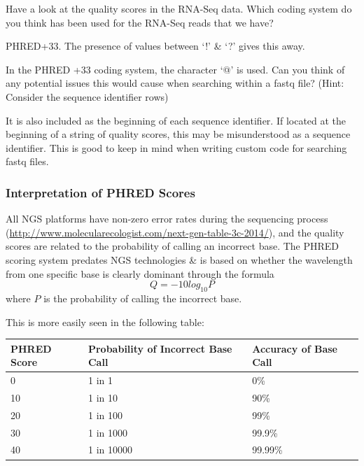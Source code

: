 \begin{questions}
Have a look at the quality scores in the RNA-Seq data. 
Which coding system do you think has been used for the RNA-Seq reads that we have? \\
\begin{answer}
PHRED+33. 
The presence of values between `!' \& `?' gives this away.\\
\end{answer}
In the PHRED +33 coding system, the character `@' is used.
Can you think of any potential issues this would cause when searching within a fastq file? 
(Hint: Consider the sequence identifier rows)\\
\begin{answer}
It is also included as the beginning of each sequence identifier.
If located at the beginning of a string of quality scores, this may be misunderstood as a sequence identifier.
This is good to keep in mind when writing custom code for searching fastq files.
\end{answer}
\end{questions}

\subsubsection{Interpretation of PHRED Scores}

\begin{information}
All NGS platforms have non-zero error rates during the sequencing process (\url{http://www.molecularecologist.com/next-gen-table-3c-2014/}), and the quality scores are related to the probability of calling an incorrect base.
The PHRED scoring system predates NGS technologies \& is based on whether the wavelength from one specific base is clearly dominant through the formula
\begin{equation}
  \label{eq:PHRED}
  Q = -10 log_{10} P
\end{equation}
where $P$ is the probability of calling the incorrect base. \\
\end{information}

This is more easily seen in the following table: \\
\begin{center}
\begin{tabular}[h]{|p{3cm} p{5cm} p{3cm}|}
\hline
\textbf{PHRED Score} & \textbf{Probability of Incorrect Base Call} &
\textbf{Accuracy of Base Call} \\
\hline
0 & 1 in 1 & 0\% \\
10 & 1 in 10 & 90\% \\
20 & 1 in 100 & 99\% \\
30 & 1 in 1000 & 99.9\% \\
40 & 1 in 10000 & 99.99\% \\
\hline
\end{tabular}
\end{center}

